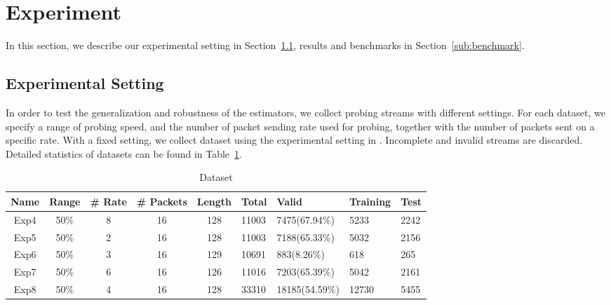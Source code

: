 \section{Experiment}
\label{sec:experiment}
In this section, we describe our  experimental setting in
Section~\ref{sub:parameter_setting}, results and benchmarks in
Section~\ref{sub:benchmark}.
\subsection{Experimental Setting}
\label{sub:parameter_setting}
In order to test the generalization and robustness of the estimators, we
collect probing streams with different settings.
For each dataset, we specify a range of probing speed, and the number of packet
sending rate used for probing, together with the number of packets sent on a
specific rate. With a fixed setting, we collect dataset using the experimental
setting in \cite{Yin2014}. Incomplete and invalid streams are discarded.
Detailed statistics of datasets can be found in Table~\ref{tab:dataset}.

\begin{table}[htpb]
   \centering
   \caption{Dataset}
   \label{tab:dataset}
   \begin{tabular}{|c|c|c|c|c|l|l|l|l|}
      \hline
      Name & Range & \# Rate & \# Packets & Length & Total & Valid          & Training & Test\\ \hline
      Exp4 & 50\%  & 8       & 16         & 128    & 11003 & 7475(67.94\%)  & 5233     & 2242 \\
      Exp5 & 50\%  & 2       & 16         & 128    & 11003 & 7188(65.33\%)  & 5032     & 2156 \\
      Exp6 & 50\%  & 3       & 16         & 129    & 10691 & 883(8.26\%)    & 618      & 265 \\
      Exp7 & 50\%  & 6       & 16         & 126    & 11016 & 7203(65.39\%)  & 5042     & 2161 \\
      Exp8 & 50\%  & 4       & 16         & 128    & 33310 & 18185(54.59\%) & 12730    & 5455  \\ \hline
   \end{tabular}
\end{table}

